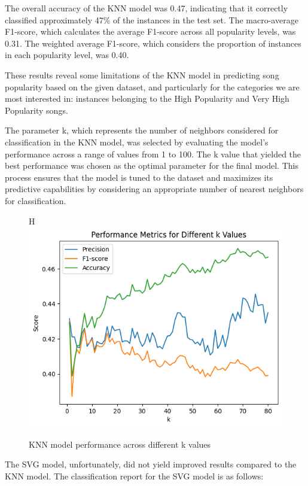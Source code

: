 \documentclass[11pt]{article} %
\begin{document}
The overall accuracy of the KNN model was 0.47, indicating that it correctly classified approximately 47\% of the instances in the test set. The macro-average F1-score, which calculates the average F1-score across all popularity levels, was 0.31. The weighted average F1-score, which considers the proportion of instances in each popularity level, was 0.40.

These results reveal some limitations of the KNN model in predicting song popularity based on the given dataset, and particularly for the categories we are most interested in: instances belonging to the High Popularity and Very High Popularity songs.

The parameter k, which represents the number of neighbors considered for classification in the KNN model, was selected by evaluating the model's performance across a range of values from 1 to 100. The k value that yielded the best performance was chosen as the optimal parameter for the final model. This process ensures that the model is tuned to the dataset and maximizes its predictive capabilities by considering an appropriate number of nearest neighbors for classification.

\begin{figure}{H}
	\centering
	\includegraphics[width=.8\linewidth]{performance_different_k_values.png}
	\caption{KNN model performance across different k values}\label{fig:knn_k_selection}
\end{figure}

The SVG model, unfortunately, did not yield improved results compared to the KNN model. The classification report for the SVG model is as follows:
\end{document}
